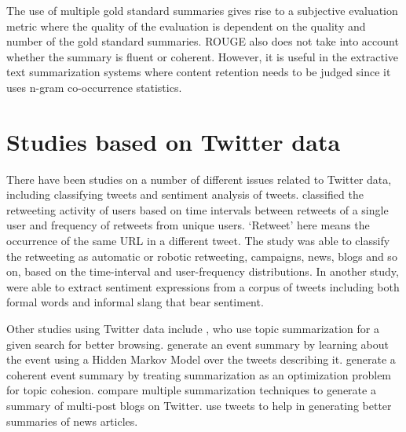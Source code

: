 The use of multiple gold standard summaries gives rise to a subjective evaluation metric where the quality of the evaluation is dependent on the quality and number of the gold standard summaries. ROUGE also does not take into account whether the summary is fluent or coherent. However, it is useful in the extractive text summarization systems where content retention needs to be judged since it uses n-gram co-occurrence statistics.


\section{Studies based on Twitter data}

There have been studies on a number of different issues related to Twitter data, including classifying tweets and sentiment analysis of tweets. \cite{ghosh2011entropy} classified the retweeting activity of users based on time intervals between retweets of a single user and frequency of retweets from unique users. `Retweet' here means the occurrence of the same URL in a different tweet. The study was able to classify the retweeting as automatic or robotic retweeting, campaigns, news, blogs and so on, based on the time-interval and user-frequency distributions. In another study, \cite{chen2012extracting} were able to extract sentiment expressions from a corpus of tweets including both formal words and informal slang that bear sentiment.

Other studies using Twitter data include \cite{o2010tweetmotif}, who use topic summarization for a given search for better browsing. \cite{chakrabarti2011event} generate an event summary by learning about the event using a Hidden Markov Model over the tweets describing it. \cite{wang2014socially} generate a coherent event summary by treating summarization as an optimization problem for topic cohesion. \cite{inouye2011comparing} compare multiple summarization techniques to generate a summary of multi-post blogs on Twitter. \cite{wei2014utilizing} use tweets to help in generating better summaries of news articles.

